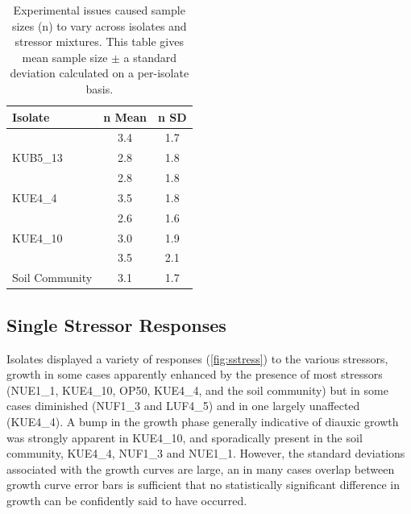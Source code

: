 \documentclass[10pt]{article}
\begin{document}
\begin{table}[ht]
\centering
\small
\begin{tabular}{l c c}
\toprule 
\textbf{Isolate} & \textbf{n Mean} & \textbf{n SD}  \\
\midrule
\rowcolor{gggrey}{LUF4\_5} & 3.4 & 1.7 \\
{KUB5\_13} & 2.8 & 1.8 \\
\rowcolor{gggrey}{NUF1\_3} & 2.8 & 1.8\\
{KUE4\_4} & 3.5 & 1.8\\
\rowcolor{gggrey}{NUE1\_1} & 2.6 & 1.6\\
{KUE4\_10} & 3.0 & 1.9 \\
\rowcolor{gggrey}{OP50} & 3.5 & 2.1 \\
{Soil Community} & 3.1 & 1.7\\
\bottomrule
\end{tabular}
\caption{Experimental issues caused sample sizes (n) to vary across isolates and stressor mixtures. This table gives mean sample size $\pm$ a standard deviation calculated on a per-isolate basis.}
\label{tab:samples}
\end{table}

\newpage
\subsection{Single Stressor Responses}
\label{S:3:3}

Isolates displayed a variety of responses (\cref{fig:sstress}) to the various stressors, growth in some cases apparently enhanced by the presence of most stressors (NUE1\_1, KUE4\_10, OP50, KUE4\_4, and the soil community) but in some cases diminished (NUF1\_3 and LUF4\_5) and in one largely unaffected (KUE4\_4). A bump in  the growth phase generally indicative of diauxic growth was strongly apparent in KUE4\_10, and sporadically present in the soil community, KUE4\_4, NUF1\_3 and NUE1\_1. However, the standard deviations associated with the growth curves are large, an in many cases overlap between growth curve error bars is sufficient that no statistically significant difference in growth can be confidently said to have occurred.
\end{document}
